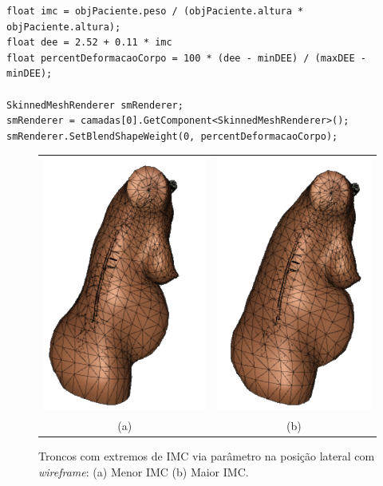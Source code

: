 \begin{lstlisting}[label=lst:codigo_alteracao_forma_paciente, caption={Exemplo de alteração do corpo do paciente via script em C\#.}, language=sharpc]
float imc = objPaciente.peso / (objPaciente.altura * objPaciente.altura);
float dee = 2.52 + 0.11 * imc
float percentDeformacaoCorpo = 100 * (dee - minDEE) / (maxDEE - minDEE);
        
SkinnedMeshRenderer smRenderer;
smRenderer = camadas[0].GetComponent<SkinnedMeshRenderer>();
smRenderer.SetBlendShapeWeight(0, percentDeformacaoCorpo);
\end{lstlisting}

\begin{figure}[ht!]
    \centering
        \begin{tabular}{cc}
        \includegraphics[width=0.4\linewidth]{capitulos/figuras/Corpo-menor-IMC-Wireframe.png} & 
        \includegraphics[width=0.38\linewidth]{capitulos/figuras/Corpo-maior-IMC-Wireframe.png} 
        \\
        (a) & (b)
        \end{tabular}
    \caption{Troncos com extremos de \acrshort{IMC} via parâmetro na posição lateral com \textit{wireframe}: (a) Menor \acrshort{IMC} (b) Maior \acrshort{IMC}.}
    \label{fig:extremosCorpoIMC}
\end{figure}

